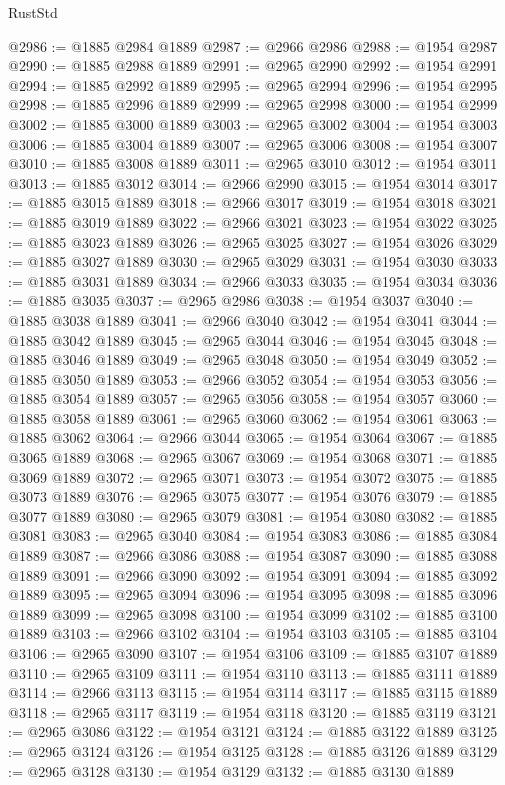 \begin{lexlean}{RustStd}
\begin{coremodule}
@2986 := @1885 @2984 @1889
@2987 := @2966 @2986
@2988 := @1954 @2987
@2990 := @1885 @2988 @1889
@2991 := @2965 @2990
@2992 := @1954 @2991
@2994 := @1885 @2992 @1889
@2995 := @2965 @2994
@2996 := @1954 @2995
@2998 := @1885 @2996 @1889
@2999 := @2965 @2998
@3000 := @1954 @2999
@3002 := @1885 @3000 @1889
@3003 := @2965 @3002
@3004 := @1954 @3003
@3006 := @1885 @3004 @1889
@3007 := @2965 @3006
@3008 := @1954 @3007
@3010 := @1885 @3008 @1889
@3011 := @2965 @3010
@3012 := @1954 @3011
@3013 := @1885 @3012
@3014 := @2966 @2990
@3015 := @1954 @3014
@3017 := @1885 @3015 @1889
@3018 := @2966 @3017
@3019 := @1954 @3018
@3021 := @1885 @3019 @1889
@3022 := @2966 @3021
@3023 := @1954 @3022
@3025 := @1885 @3023 @1889
@3026 := @2965 @3025
@3027 := @1954 @3026
@3029 := @1885 @3027 @1889
@3030 := @2965 @3029
@3031 := @1954 @3030
@3033 := @1885 @3031 @1889
@3034 := @2966 @3033
@3035 := @1954 @3034
@3036 := @1885 @3035
@3037 := @2965 @2986
@3038 := @1954 @3037
@3040 := @1885 @3038 @1889
@3041 := @2966 @3040
@3042 := @1954 @3041
@3044 := @1885 @3042 @1889
@3045 := @2965 @3044
@3046 := @1954 @3045
@3048 := @1885 @3046 @1889
@3049 := @2965 @3048
@3050 := @1954 @3049
@3052 := @1885 @3050 @1889
@3053 := @2966 @3052
@3054 := @1954 @3053
@3056 := @1885 @3054 @1889
@3057 := @2965 @3056
@3058 := @1954 @3057
@3060 := @1885 @3058 @1889
@3061 := @2965 @3060
@3062 := @1954 @3061
@3063 := @1885 @3062
@3064 := @2966 @3044
@3065 := @1954 @3064
@3067 := @1885 @3065 @1889
@3068 := @2965 @3067
@3069 := @1954 @3068
@3071 := @1885 @3069 @1889
@3072 := @2965 @3071
@3073 := @1954 @3072
@3075 := @1885 @3073 @1889
@3076 := @2965 @3075
@3077 := @1954 @3076
@3079 := @1885 @3077 @1889
@3080 := @2965 @3079
@3081 := @1954 @3080
@3082 := @1885 @3081
@3083 := @2965 @3040
@3084 := @1954 @3083
@3086 := @1885 @3084 @1889
@3087 := @2966 @3086
@3088 := @1954 @3087
@3090 := @1885 @3088 @1889
@3091 := @2966 @3090
@3092 := @1954 @3091
@3094 := @1885 @3092 @1889
@3095 := @2965 @3094
@3096 := @1954 @3095
@3098 := @1885 @3096 @1889
@3099 := @2965 @3098
@3100 := @1954 @3099
@3102 := @1885 @3100 @1889
@3103 := @2966 @3102
@3104 := @1954 @3103
@3105 := @1885 @3104
@3106 := @2965 @3090
@3107 := @1954 @3106
@3109 := @1885 @3107 @1889
@3110 := @2965 @3109
@3111 := @1954 @3110
@3113 := @1885 @3111 @1889
@3114 := @2966 @3113
@3115 := @1954 @3114
@3117 := @1885 @3115 @1889
@3118 := @2965 @3117
@3119 := @1954 @3118
@3120 := @1885 @3119
@3121 := @2965 @3086
@3122 := @1954 @3121
@3124 := @1885 @3122 @1889
@3125 := @2965 @3124
@3126 := @1954 @3125
@3128 := @1885 @3126 @1889
@3129 := @2965 @3128
@3130 := @1954 @3129
@3132 := @1885 @3130 @1889

\end{coremodule}
\end{lexlean}
